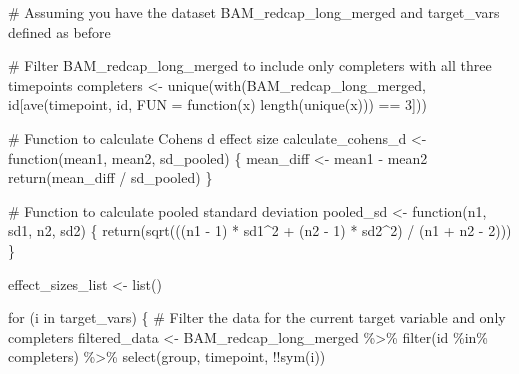 \documentclass[
  letterpaper,
  DIV=11,
  numbers=noendperiod]{scrreprt}
\newenvironment{Shaded}{\begin{snugshade}}{\end{snugshade}}
\newcommand{\AttributeTok}[1]{\textcolor[rgb]{0.40,0.45,0.13}{#1}}
\newcommand{\CommentTok}[1]{\textcolor[rgb]{0.37,0.37,0.37}{#1}}
\newcommand{\ControlFlowTok}[1]{\textcolor[rgb]{0.00,0.23,0.31}{#1}}
\newcommand{\DecValTok}[1]{\textcolor[rgb]{0.68,0.00,0.00}{#1}}
\newcommand{\FunctionTok}[1]{\textcolor[rgb]{0.28,0.35,0.67}{#1}}
\newcommand{\NormalTok}[1]{\textcolor[rgb]{0.00,0.23,0.31}{#1}}
\newcommand{\OtherTok}[1]{\textcolor[rgb]{0.00,0.23,0.31}{#1}}
\newcommand{\SpecialCharTok}[1]{\textcolor[rgb]{0.37,0.37,0.37}{#1}}
\begin{document}
\begin{Shaded}
\begin{Highlighting}[]
\CommentTok{\# Assuming you have the dataset BAM\_redcap\_long\_merged and target\_vars defined as before}

\CommentTok{\# Filter BAM\_redcap\_long\_merged to include only completers with all three timepoints}
\NormalTok{completers }\OtherTok{\textless{}{-}} \FunctionTok{unique}\NormalTok{(}\FunctionTok{with}\NormalTok{(BAM\_redcap\_long\_merged, id[}\FunctionTok{ave}\NormalTok{(timepoint, id, }\AttributeTok{FUN =} \ControlFlowTok{function}\NormalTok{(x) }\FunctionTok{length}\NormalTok{(}\FunctionTok{unique}\NormalTok{(x))) }\SpecialCharTok{==} \DecValTok{3}\NormalTok{]))}

\CommentTok{\# Function to calculate Cohen\textquotesingle{}s d effect size}
\NormalTok{calculate\_cohens\_d }\OtherTok{\textless{}{-}} \ControlFlowTok{function}\NormalTok{(mean1, mean2, sd\_pooled) \{}
\NormalTok{  mean\_diff }\OtherTok{\textless{}{-}}\NormalTok{ mean1 }\SpecialCharTok{{-}}\NormalTok{ mean2}
  \FunctionTok{return}\NormalTok{(mean\_diff }\SpecialCharTok{/}\NormalTok{ sd\_pooled)}
\NormalTok{\}}


\CommentTok{\# Function to calculate pooled standard deviation}
\NormalTok{pooled\_sd }\OtherTok{\textless{}{-}} \ControlFlowTok{function}\NormalTok{(n1, sd1, n2, sd2) \{}
  \FunctionTok{return}\NormalTok{(}\FunctionTok{sqrt}\NormalTok{(((n1 }\SpecialCharTok{{-}} \DecValTok{1}\NormalTok{) }\SpecialCharTok{*}\NormalTok{ sd1}\SpecialCharTok{\^{}}\DecValTok{2} \SpecialCharTok{+}\NormalTok{ (n2 }\SpecialCharTok{{-}} \DecValTok{1}\NormalTok{) }\SpecialCharTok{*}\NormalTok{ sd2}\SpecialCharTok{\^{}}\DecValTok{2}\NormalTok{) }\SpecialCharTok{/}\NormalTok{ (n1 }\SpecialCharTok{+}\NormalTok{ n2 }\SpecialCharTok{{-}} \DecValTok{2}\NormalTok{)))}
\NormalTok{\}}

\NormalTok{effect\_sizes\_list }\OtherTok{\textless{}{-}} \FunctionTok{list}\NormalTok{()}

\ControlFlowTok{for}\NormalTok{ (i }\ControlFlowTok{in}\NormalTok{ target\_vars) \{}
  \CommentTok{\# Filter the data for the current target variable and only completers}
\NormalTok{  filtered\_data }\OtherTok{\textless{}{-}}\NormalTok{ BAM\_redcap\_long\_merged }\SpecialCharTok{\%\textgreater{}\%}
    \FunctionTok{filter}\NormalTok{(id }\SpecialCharTok{\%in\%}\NormalTok{ completers) }\SpecialCharTok{\%\textgreater{}\%}
    \FunctionTok{select}\NormalTok{(group, timepoint, }\SpecialCharTok{!!}\FunctionTok{sym}\NormalTok{(i))}
  

\end{Highlighting}
\end{Shaded}
\end{document}
